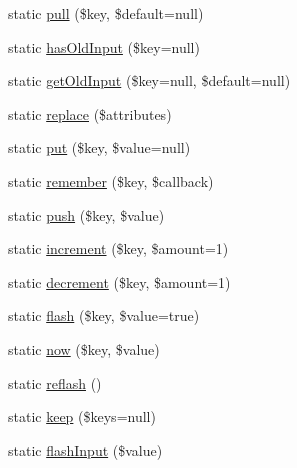 \begin{DoxyCompactItemize}
\item 
static \mbox{\hyperlink{class_illuminate_1_1_support_1_1_facades_1_1_session_a38237c97957723cbabe497fd24905855}{pull}} (\$key, \$default=null)
\item 
static \mbox{\hyperlink{class_illuminate_1_1_support_1_1_facades_1_1_session_a06d0004ca97b3b3c533feba7fd112c4e}{has\+Old\+Input}} (\$key=null)
\item 
static \mbox{\hyperlink{class_illuminate_1_1_support_1_1_facades_1_1_session_a15985a60bd1ec04ae29797de89f7a416}{get\+Old\+Input}} (\$key=null, \$default=null)
\item 
static \mbox{\hyperlink{class_illuminate_1_1_support_1_1_facades_1_1_session_aec9f4aeb49f8ba37080d91ec4f2c032c}{replace}} (\$attributes)
\item 
static \mbox{\hyperlink{class_illuminate_1_1_support_1_1_facades_1_1_session_a93fbf0478f1e485a31cba0fbba2a9374}{put}} (\$key, \$value=null)
\item 
static \mbox{\hyperlink{class_illuminate_1_1_support_1_1_facades_1_1_session_a8129affd74553cb59da18882b8cc7056}{remember}} (\$key, \$callback)
\item 
static \mbox{\hyperlink{class_illuminate_1_1_support_1_1_facades_1_1_session_a5566111728b1ebcb75ed1bba27516fa1}{push}} (\$key, \$value)
\item 
static \mbox{\hyperlink{class_illuminate_1_1_support_1_1_facades_1_1_session_ae328b646d330b4dda3775b922e0859c1}{increment}} (\$key, \$amount=1)
\item 
static \mbox{\hyperlink{class_illuminate_1_1_support_1_1_facades_1_1_session_a222d0985d0319c59487d989520fd0e7e}{decrement}} (\$key, \$amount=1)
\item 
static \mbox{\hyperlink{class_illuminate_1_1_support_1_1_facades_1_1_session_a36b2cb4a5ba46dad7630d5eebd2ca96f}{flash}} (\$key, \$value=true)
\item 
static \mbox{\hyperlink{class_illuminate_1_1_support_1_1_facades_1_1_session_a29ea95ba8166d08816f5dd78d79fe6c8}{now}} (\$key, \$value)
\item 
static \mbox{\hyperlink{class_illuminate_1_1_support_1_1_facades_1_1_session_a74606005bfa03c6b5a15b6d63c2ba8f6}{reflash}} ()
\item 
static \mbox{\hyperlink{class_illuminate_1_1_support_1_1_facades_1_1_session_af794689814c0771dc97e95deb177b179}{keep}} (\$keys=null)
\item 
static \mbox{\hyperlink{class_illuminate_1_1_support_1_1_facades_1_1_session_aaba3d59ed997be4d2ed9d16b08c1f317}{flash\+Input}} (\$value)

\end{DoxyCompactItemize}
